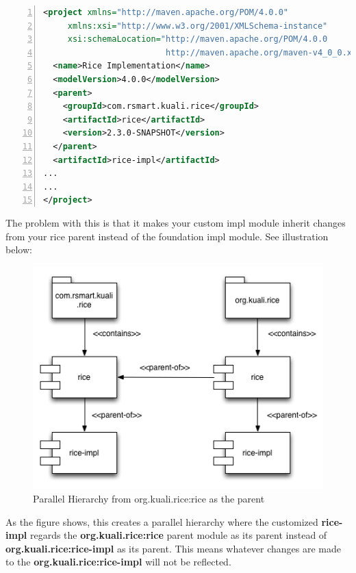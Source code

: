 \documentclass[12pt,notitlepage]{article}
\begin{document}
\begin{lstlisting}[numbers=left,language=xml,basicstyle=\scriptsize,backgroundcolor=\color{ubergray},caption={Custom Impl Module Parent Definition},frame=single,breaklines=true]
<project xmlns="http://maven.apache.org/POM/4.0.0" 
     xmlns:xsi="http://www.w3.org/2001/XMLSchema-instance" 
     xsi:schemaLocation="http://maven.apache.org/POM/4.0.0 
                         http://maven.apache.org/maven-v4_0_0.xsd">
  <name>Rice Implementation</name>
  <modelVersion>4.0.0</modelVersion>
  <parent>
    <groupId>com.rsmart.kuali.rice</groupId>
    <artifactId>rice</artifactId>
    <version>2.3.0-SNAPSHOT</version>
  </parent>
  <artifactId>rice-impl</artifactId>
...
...
</project>
  \end{lstlisting}

The problem with this is that it makes your custom impl module inherit changes from your rice parent instead of the foundation impl module. See illustration below:

\begin{figure}[hbp]
  \includegraphics[width=\textwidth]{diagrams/RiceMaven1.png}
  \caption{Parallel Hierarchy from org.kuali.rice:rice as the parent}
\end{figure}

As the figure shows, this creates a parallel hierarchy where the customized \textbf{rice-impl} regards the \textbf{org.kuali.rice:rice} parent module as its parent instead of \textbf{org.kuali.rice:rice-impl} as its parent. This means whatever changes are made to the \textbf{org.kuali.rice:rice-impl} will not be reflected. 
\end{document}
